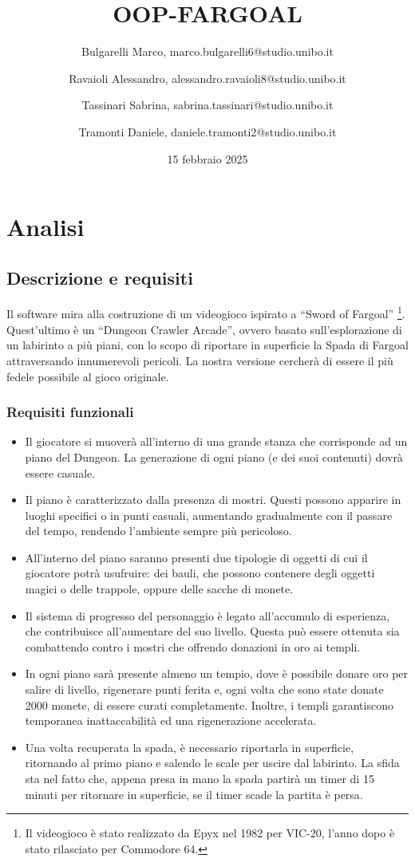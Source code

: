 \documentclass{report}
\title{OOP-FARGOAL}
\author{
    Bulgarelli Marco, marco.bulgarelli6@studio.unibo.it \and 
    Ravaioli Alessandro, alessandro.ravaioli8@studio.unibo.it \and
    Tassinari Sabrina, sabrina.tassinari@studio.unibo.it \and
    Tramonti Daniele, daniele.tramonti2@studio.unibo.it 
}
\date{15 febbraio 2025}
\begin{document}
\maketitle

\tableofcontents

\chapter{Analisi}

\section{Descrizione e requisiti}

Il software mira alla costruzione di un videogioco ispirato a “Sword of Fargoal” \footnote{
    Il videogioco è stato realizzato da Epyx nel 1982 per VIC-20, l'anno dopo è stato rilasciato per Commodore 64.
}. 
%
Quest’ultimo è un “Dungeon Crawler Arcade”, ovvero basato sull’esplorazione di un labirinto a più piani, con lo scopo di riportare in superficie la Spada di Fargoal attraversando innumerevoli pericoli. 
%
La nostra versione cercherà di essere il più fedele possibile al gioco originale.

\subsection{Requisiti funzionali}
\begin{itemize}
    \item Il giocatore si muoverà all’interno di una grande stanza che corrisponde ad un piano del Dungeon. La generazione di ogni piano (e dei suoi contenuti) dovrà essere casuale.
    \item Il piano è caratterizzato dalla presenza di mostri. Questi possono apparire in luoghi specifici o in punti casuali, aumentando gradualmente con il passare del tempo, rendendo l’ambiente sempre più pericoloso.
    \item All’interno del piano saranno presenti due tipologie di oggetti di cui il giocatore potrà usufruire: dei bauli, che possono contenere degli oggetti magici o delle trappole, oppure delle sacche di monete.
    \item Il sistema di progresso del personaggio è legato all’accumulo di esperienza, che contribuisce all’aumentare del suo livello. Questa può essere ottenuta sia combattendo contro i mostri che offrendo donazioni in oro ai templi.
    \item In ogni piano sarà presente almeno un tempio, dove è possibile donare oro per salire di livello, rigenerare punti ferita e, ogni volta che sono state donate 2000 monete, di essere curati completamente. Inoltre, i templi garantiscono temporanea inattaccabilità ed una rigenerazione accelerata.
    \item Una volta recuperata la spada, è necessario riportarla in superficie, ritornando al primo piano e salendo le scale per uscire dal labirinto. La sfida sta nel fatto che, appena presa in mano la spada partirà un timer di 15 minuti per ritornare in superficie, se il timer scade la partita è persa.
\end{itemize}
\end{document}

